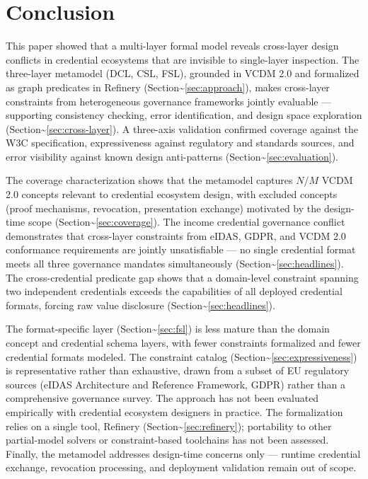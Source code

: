
\section{Conclusion}\label{conclusion}

\label{sec:conclusion}

This paper showed that a multi-layer formal model reveals cross-layer design conflicts in credential ecosystems that are invisible to single-layer inspection. The three-layer metamodel (DCL, CSL, FSL), grounded in VCDM 2.0 and formalized as graph predicates in Refinery (Section\textasciitilde{}\ref{sec:approach}), makes cross-layer constraints from heterogeneous governance frameworks jointly evaluable --- supporting consistency checking, error identification, and design space exploration (Section\textasciitilde{}\ref{sec:cross-layer}). A three-axis validation confirmed coverage against the W3C specification, expressiveness against regulatory and standards sources, and error visibility against known design anti-patterns (Section\textasciitilde{}\ref{sec:evaluation}).

The coverage characterization shows that the metamodel captures  \(N\)/\(M\) VCDM 2.0 concepts relevant to credential ecosystem design, with excluded concepts (proof mechanisms, revocation, presentation exchange) motivated by the design-time scope (Section\textasciitilde{}\ref{sec:coverage}). The income credential governance conflict demonstrates that cross-layer constraints from eIDAS, GDPR, and VCDM 2.0 conformance requirements are jointly unsatisfiable --- no single credential format meets all three governance mandates simultaneously (Section\textasciitilde{}\ref{sec:headlines}). The cross-credential predicate gap shows that a domain-level constraint spanning two independent credentials exceeds the capabilities of all deployed credential formats, forcing raw value disclosure (Section\textasciitilde{}\ref{sec:headlines}).

The format-specific layer (Section\textasciitilde{}\ref{sec:fsl}) is less mature than the domain concept and credential schema layers, with fewer constraints formalized and fewer credential formats modeled. The constraint catalog (Section\textasciitilde{}\ref{sec:expressiveness}) is representative rather than exhaustive, drawn from a subset of EU regulatory sources (eIDAS Architecture and Reference Framework, GDPR) rather than a comprehensive governance survey. The approach has not been evaluated empirically with credential ecosystem designers in practice. The formalization relies on a single tool, Refinery (Section\textasciitilde{}\ref{sec:refinery}); portability to other partial-model solvers or constraint-based toolchains has not been assessed. Finally, the metamodel addresses design-time concerns only --- runtime credential exchange, revocation processing, and deployment validation remain out of scope.

